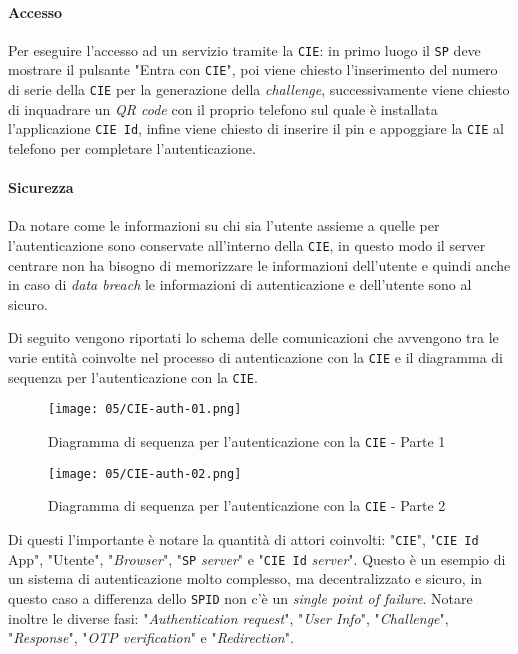             \paragraph{Accesso} Per eseguire l'accesso ad un servizio tramite la \texttt{CIE}: in primo luogo il \texttt{SP} deve mostrare il pulsante "Entra con \texttt{CIE}", poi viene chiesto l'inserimento del numero di serie della \texttt{CIE} per la generazione della \textit{challenge}, successivamente viene chiesto di inquadrare un \textit{QR code} con il proprio telefono sul quale è installata l'applicazione \texttt{CIE Id}, infine viene chiesto di inserire il pin e appoggiare la \texttt{CIE} al telefono per completare l'autenticazione.
            
        \paragraph{Sicurezza} Da notare come le informazioni su chi sia l'utente assieme a quelle per l'autenticazione sono conservate all'interno della \texttt{CIE}, in questo modo il server centrare non ha bisogno di memorizzare le informazioni dell'utente e quindi anche in caso di \textit{data breach} le informazioni di autenticazione e dell'utente sono al sicuro.

        Di seguito vengono riportati lo schema delle comunicazioni che avvengono tra le varie entità coinvolte nel processo di autenticazione con la \texttt{CIE} e il diagramma di sequenza per l'autenticazione con la \texttt{CIE}.
        
        \begin{figure}[H]
            \centering
            \texttt{[image: 05/CIE-auth-01.png]}
            \caption{Diagramma di sequenza per l'autenticazione con la \texttt{CIE} - Parte 1}
        \end{figure}
        \begin{figure}[H]
            \centering
            \texttt{[image: 05/CIE-auth-02.png]}
            \caption{Diagramma di sequenza per l'autenticazione con la \texttt{CIE} - Parte 2}
        \end{figure}

        Di questi l'importante è notare la quantità di attori coinvolti: "\texttt{CIE}", "\texttt{CIE Id} App", "Utente", "\textit{Browser}", "\texttt{SP} \textit{server}" e "\texttt{CIE Id} \textit{server}". Questo è un esempio di un sistema di autenticazione molto complesso, ma decentralizzato e sicuro, in questo caso a differenza dello \texttt{SPID} non c'è un \textit{single point of failure}. Notare inoltre le diverse fasi: "\textit{Authentication request}", "\textit{User Info}", "\textit{Challenge}", "\textit{Response}", "\textit{OTP verification}" e "\textit{Redirection}".
